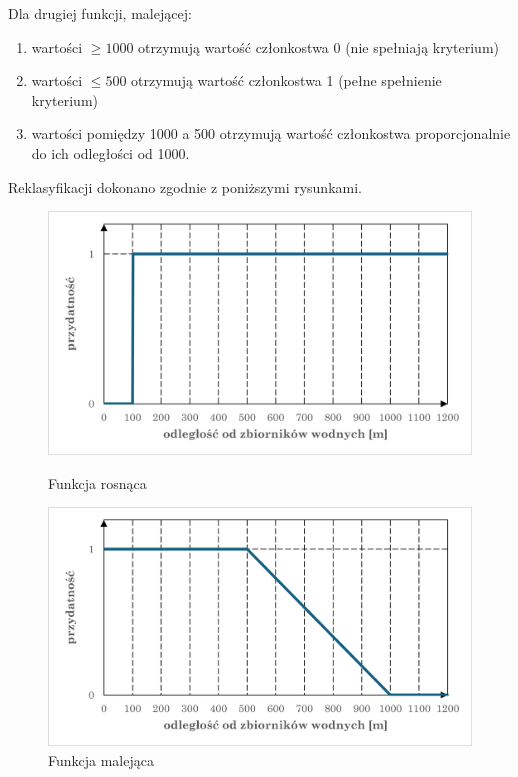 \documentclass{article}
\begin{document}
Dla drugiej funkcji, malejącej:
\begin{enumerate}[label=•]
    \item wartości \( \geq 1000 \) otrzymują wartość członkostwa 0 (nie spełniają kryterium)
    \item wartości \( \leq 500 \) otrzymują wartość członkostwa 1 (pełne spełnienie kryterium)
    \item wartości pomiędzy 1000 a 500 otrzymują wartość członkostwa proporcjonalnie do ich odległości od 1000.
\end{enumerate}
\vspace{10pt}

Reklasyfikacji dokonano zgodnie z poniższymi rysunkami.
\vspace{5pt}

\begin{figure}[H]
    \centering
    \begin{minipage}{0.48\textwidth}
        \centering
        \includegraphics[width=\linewidth]{img/kryterium1-wykres-rosnaca.png}
        \caption{Funkcja rosnąca}
    \end{minipage}
    \begin{minipage}{0.48\textwidth}
        \centering
        \includegraphics[width=\linewidth]{img/kryterium1-wykres-malejaca.png}
        \caption{Funkcja malejąca}
    \end{minipage}
\end{figure}
\vspace{10pt}
\end{document}

